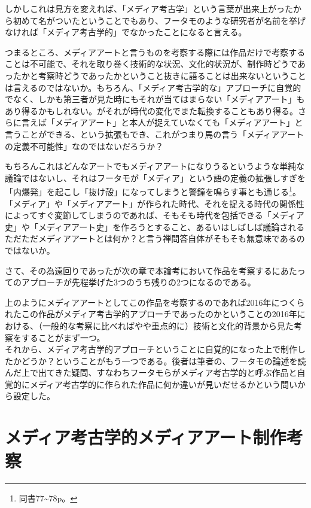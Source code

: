 しかしこれは見方を変えれば、「メディア考古学」という言葉が出来上がったから初めて名がついたということでもあり、フータモのような研究者が名前を挙げなければ「メディア考古学的」でなかったことになると言える。

つまるところ、メディアアートと言うものを考察する際には作品だけで考察することは不可能で、それを取り巻く技術的な状況、文化的状況が、制作時どうであったかと考察時どうであったかということ抜きに語ることは出来ないということは言えるのではないか。もちろん、「メディア考古学的な」アプローチに自覚的でなく、しかも第三者が見た時にもそれが当てはまらない「メディアアート」もあり得るかもしれない。がそれが時代の変化でまた転換することもあり得る。さらに言えば「メディアアート」と本人が捉えていなくても「メディアアート」と言うことができる、という拡張もでき、これがつまり馬の言う「メディアアートの定義不可能性」なのではないだろうか？

もちろんこれはどんなアートでもメディアアートになりうるというような単純な議論ではないし、それはフータモが「メディア」という語の定義の拡張しすぎを「内爆発」を起こし「抜け殻」になってしまうと警鐘を鳴らす事とも通じる\footnote{同書77\textasciitilde{}78p。}。「メディア」や「メディアアート」が作られた時代、それを捉える時代の関係性によってすぐ変節してしまうのであれば、そもそも時代を包括できる「メディア史」や「メディアアート史」を作ろうとすること、あるいはしばしば議論されるただただメディアアートとは何か？と言う禅問答自体がそもそも無意味であるのではないか。

さて、その為遠回りであったが次の章で本論考において作品を考察するにあたってのアプローチが先程挙げた3つのうち残りの2つになるのである。

上のようにメディアアートとしてこの作品を考察するのであれば2016年につくられたこの作品がメディア考古学的アプローチであったのかということの2016年における、（一般的な考察に比べればやや重点的に）技術と文化的背景から見た考察をすることがまず一つ。\\
それから、メディア考古学的アプローチということに自覚的になった上で制作したかどうか？ということがもう一つである。後者は筆者の、フータモの論述を読んだ上で出てきた疑問、すなわちフータモらがメディア考古学的と呼ぶ作品と自覚的にメディア考古学的に作られた作品に何か違いが見いだせるかという問いから設定した。

\chapter{メディア考古学的メディアアート制作考察}\label{ux30e1ux30c7ux30a3ux30a2ux8003ux53e4ux5b66ux7684ux30e1ux30c7ux30a3ux30a2ux30a2ux30fcux30c8ux5236ux4f5cux8003ux5bdf}

